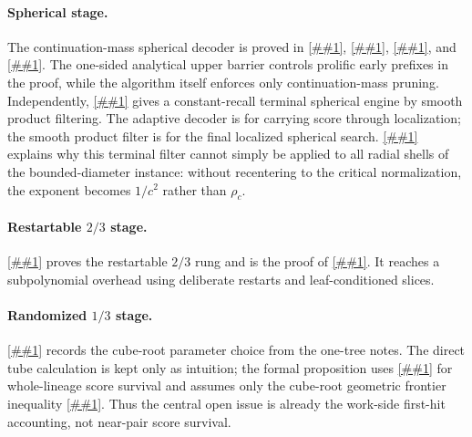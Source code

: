 \documentclass[10pt]{article}
\newcommand{\cref}[1]{\ref{##1}}
\newcommand{\Cref}[1]{\ref{##1}}
\theoremstyle{definition}
\begin{document}
\paragraph{Spherical stage.}
The continuation-mass spherical decoder is proved in \cref{lem:continuation-work}, \cref{lem:good-first-moment}, \cref{lem:tame-second-moment}, and \cref{cor:spherical-survival}. The one-sided analytical upper barrier controls prolific early prefixes in the proof, while the algorithm itself enforces only continuation-mass pruning. Independently, \cref{thm:smooth-product-terminal} gives a constant-recall terminal spherical engine by smooth product filtering. The adaptive decoder is for carrying score through localization; the smooth product filter is for the final localized spherical search. \Cref{lem:flat-shell-obstruction} explains why this terminal filter cannot simply be applied to all radial shells of the bounded-diameter instance: without recentering to the critical normalization, the exponent becomes $1/c^2$ rather than $\rho_c$.

\paragraph{Restartable \(2/3\) stage.}
\Cref{prop:slice-two-thirds} proves the restartable $2/3$ rung and is the proof of \cref{thm:main}. It reaches a subpolynomial overhead using deliberate restarts and leaf-conditioned slices.

\paragraph{Randomized \(1/3\) stage.}
\Cref{prop:one-third} records the cube-root parameter choice from the one-tree notes. The direct tube calculation is kept only as intuition; the formal proposition uses \cref{lem:adaptive-continuation} for whole-lineage score survival and assumes only the cube-root geometric frontier inequality \cref{asm:mixed-operator}. Thus the central open issue is already the work-side first-hit accounting, not near-pair score survival.
\end{document}
